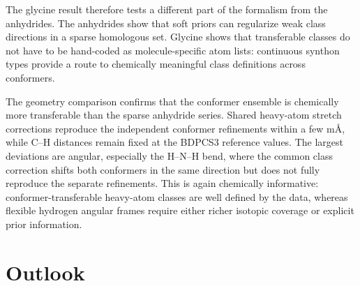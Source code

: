 \documentclass[journal=jpclcd,manuscript=letter]{achemso}
\begin{document}
\begin{table}[H]
\centering
\caption{Continuous synthon classes used for the glycine I/II fit.  The prototype column lists the $Z_\mathrm{eff}$ values defining the class; each primitive coordinate matches when the chemically relevant $Z_\mathrm{eff}$ signature is within 0.035 of the prototype.  Corrections are in internal-coordinate units.}
\label{tab:glycine_synthon_classes}

\end{table}

The glycine result therefore tests a different part of the formalism from the anhydrides.  The anhydrides show that soft priors can regularize weak class directions in a sparse homologous set.  Glycine shows that transferable classes do not have to be hand-coded as molecule-specific atom lists: continuous synthon types provide a route to chemically meaningful class definitions across conformers.

\begin{table}[H]
\centering
\caption{Geometry-level comparison between the synthon-typed glycine I/II ensemble refinement and independent conformer refinements.  Values are class averages over matched primitive coordinates.  Stretch differences are reported in m\AA{} in the last column; angle differences are reported in degrees.}
\label{tab:glycine_geometry}

\end{table}

The geometry comparison confirms that the conformer ensemble is chemically more transferable than the sparse anhydride series.  Shared heavy-atom stretch corrections reproduce the independent conformer refinements within a few m\AA{}, while C--H distances remain fixed at the BDPCS3 reference values.  The largest deviations are angular, especially the H--N--H bend, where the common class correction shifts both conformers in the same direction but does not fully reproduce the separate refinements.  This is again chemically informative: conformer-transferable heavy-atom classes are well defined by the data, whereas flexible hydrogen angular frames require either richer isotopic coverage or explicit prior information.

\section*{Outlook}
\end{document}
